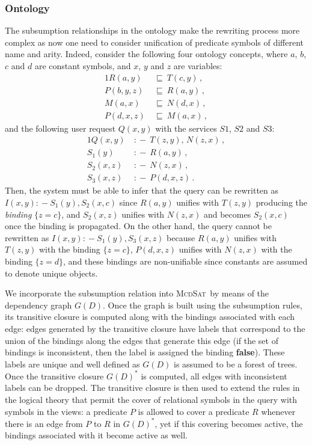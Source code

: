 \documentclass{llncs}
\newcommand{\mcdsat}{\textsc{McdSat}}
\newcommand{\qrule}{:\!\!-}
\newcommand{\orule}{\sqsubseteq}
\begin{document}
\subsubsection{Ontology}

The subsumption relationships in the ontology make the rewriting 
process more complex as now one need to consider unification of
predicate symbols of different name and arity. Indeed, consider
the following four ontology concepts, where $a$, $b$, $c$ and $d$
are constant symbols, and $x$, $y$ and $z$ are variables:
\begin{alignat*}{1}
R(a,y)\   &\orule\ T(c,y)\,, \\
P(b,y,z)\ &\orule\ R(a,y)\,, \\
M(a,x)\   &\orule\ N(d,x)\,, \\
P(d,x,z)\ &\orule\ M(a,x)\,,
\end{alignat*}
and the following user request $Q(x,y)$ with the services 
$S1$, $S2$ and $S3$:
\begin{alignat*}{1}
Q(x,y)\   &\qrule\ T(z,y),\,N(z,x)\,, \\
S_1(y)\   &\qrule\ R(a,y)\,, \\
S_2(x,z)\ &\qrule\ N(z,x)\,, \\
S_3(x,z)\ &\qrule\ P(d,x,z)\,.
\end{alignat*}
Then, the system must be able to infer that the query can be 
rewritten as $I(x,y) \qrule S_1(y),S_2(x,c)$ since $R(a,y)$
unifies with $T(z,y)$ producing the \emph{binding} $\{z=c\}$,
and $S_2(x,z)$ unifies with $N(z,x)$ and becomes $S_2(x,c)$
once the binding is propagated. On the other hand, the query
cannot be rewritten as $I(x,y)\qrule S_1(y),S_3(x,z)$ because
$R(a,y)$ unifies with $T(z,y)$ with the binding $\{z=c\}$,
$P(d,x,z)$ unifies with $N(z,x)$ with the binding $\{z=d\}$,
and these bindings are non-unifiable since constants
are assumed to denote unique objects.

We incorporate the subsumption relation into \mcdsat\ by means
of the dependency graph $G(D)$. Once the graph is built using
the subsumption rules, its transitive closure is computed along
with the bindings associated with each edge: edges generated by
the transitive closure have labels that correspond to the union
of the bindings along the edges that generate this edge (if the
set of bindings is inconsistent, then the label is assigned the
binding \textbf{false}).
These labels are unique and well defined as $G(D)$ is assumed
to be a forest of trees. Once the transitive closure $G(D)^*$
is computed, all edges with inconsistent labels can be dropped.
The transitive closure is then used to extend the rules in the
logical theory that permit the cover of relational symbols in
the query with symbols in the views: a predicate $P$ is allowed
to cover a predicate $R$ whenever there is an edge from $P$ to
$R$ in $G(D)^*$, yet if this covering becomes active, the 
bindings associated with it become active as well.
\end{document}
